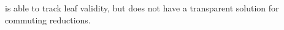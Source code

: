 \documentclass[thesis]{subfiles}
\begin{document}

 is able to track leaf validity, but does not have a transparent solution for commuting reductions.
\end{document}
